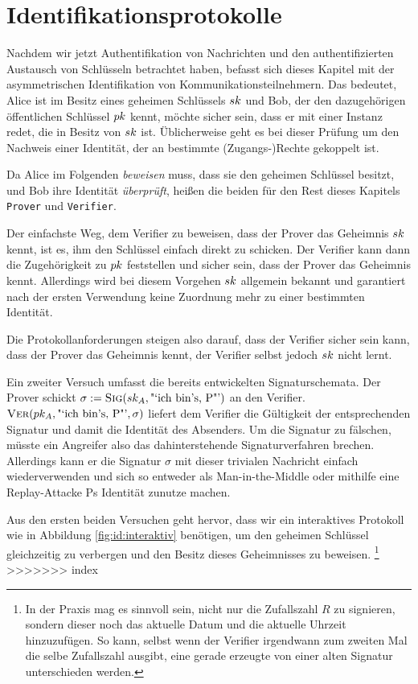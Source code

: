 \chapter{Identifikationsprotokolle}
Nachdem wir jetzt Authentifikation von Nachrichten und den authentifizierten Austausch von Schlüsseln betrachtet haben, befasst sich dieses Kapitel mit der
asymmetrischen Identifikation von Kommunikationsteilnehmern. Das bedeutet, Alice ist im Besitz eines geheimen Schlüssels $sk$ und Bob, der den dazugehörigen
öffentlichen Schlüssel $pk$ kennt, möchte sicher sein, dass er mit einer Instanz redet, die in Besitz von $sk$ ist. Üblicherweise geht es bei dieser
Prüfung um den Nachweis einer Identität, der an bestimmte (Zugangs-)Rechte gekoppelt ist.

Da Alice im Folgenden \emph{beweisen} muss, dass sie den geheimen Schlüssel besitzt, und Bob ihre Identität \emph{überprüft}, heißen die beiden für den Rest
dieses Kapitels \texttt{Prover} \indexProver und \texttt{Verifier}\indexVerifier.

Der einfachste Weg, dem Verifier zu beweisen, dass der Prover das Geheimnis $sk$ kennt, ist es, ihm den Schlüssel einfach direkt zu schicken. Der Verifier
kann dann die Zugehörigkeit zu $pk$ feststellen und sicher sein, dass der Prover das Geheimnis kennt. Allerdings wird bei diesem Vorgehen $sk$ allgemein
bekannt und garantiert nach der ersten Verwendung keine Zuordnung mehr zu einer bestimmten Identität.

Die Protokollanforderungen steigen also darauf, dass der Verifier sicher sein kann, dass der Prover das Geheimnis kennt, der Verifier selbst jedoch $sk$
nicht lernt.

Ein zweiter Versuch umfasst die bereits entwickelten Signaturschemata. Der Prover schickt $\sigma := \textsc{Sig}(sk_A, \text{"`ich bin's, P"'})$ an den Verifier.
$\textsc{Ver}(pk_A,\text{"`ich bin's, P"'}, \sigma)$ liefert dem Verifier die Gültigkeit der entsprechenden Signatur und damit die Identität des Absenders. Um die
Signatur zu fälschen, müsste ein Angreifer also das dahinterstehende Signaturverfahren brechen. Allerdings kann er die Signatur $\sigma$ mit dieser trivialen
Nachricht einfach wiederverwenden und sich so entweder als Man-in-the-Middle oder mithilfe eine Replay-Attacke Ps Identität zunutze machen.

Aus den ersten beiden Versuchen geht hervor, dass wir ein interaktives Protokoll wie in Abbildung \ref{fig:id:interaktiv} benötigen, um den geheimen Schlüssel
gleichzeitig zu verbergen und den Besitz dieses Geheimnisses zu beweisen.%
\footnote{In der Praxis mag es sinnvoll sein, nicht nur die Zufallszahl $R$ zu signieren, sondern dieser noch das aktuelle Datum und die aktuelle Uhrzeit hinzuzufügen. So kann, selbst wenn der Verifier irgendwann zum zweiten Mal die selbe Zufallszahl ausgibt, eine gerade erzeugte von einer alten Signatur unterschieden werden.}
>>>>>>> index

